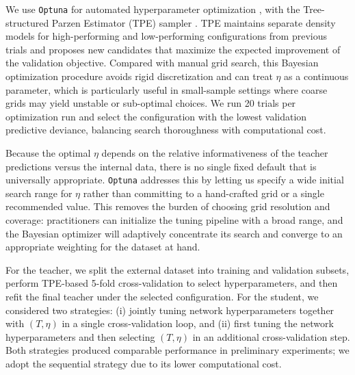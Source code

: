 \documentclass{article}
\theoremstyle{plain}
\theoremstyle{definition}
\theoremstyle{remark}
\begin{document}
We use \texttt{Optuna} for automated hyperparameter optimization \citep{optuna_2019}, with the Tree-structured Parzen Estimator (TPE) sampler \citep{bergstra2011algorithms, bergstra2013making, watanabe2023tree}.
TPE maintains separate density models for high-performing and low-performing configurations from previous trials and proposes new candidates that maximize the expected improvement of the validation objective.
Compared with manual grid search, this Bayesian optimization procedure avoids rigid discretization and can treat $\eta$ as a continuous parameter, which is particularly useful in small-sample settings where coarse grids may yield unstable or sub-optimal choices.
We run 20 trials per optimization run and select the configuration with the lowest validation predictive deviance, balancing search thoroughness with computational cost.


Because the optimal $\eta$ depends on the relative informativeness of the teacher predictions versus the internal data, there is no single fixed default that is universally appropriate.
\texttt{Optuna} addresses this by letting us specify a wide initial search range for $\eta$ rather than committing to a hand-crafted grid or a single recommended value.
This removes the burden of choosing grid resolution and coverage: practitioners can initialize the tuning pipeline with a broad range, and the Bayesian optimizer will adaptively concentrate its search and converge to an appropriate weighting for the dataset at hand.

For the teacher, we split the external dataset into training and validation subsets, perform TPE-based 5-fold cross-validation to select hyperparameters, and then refit the final teacher under the selected configuration.
For the student, we considered two strategies: (i) jointly tuning network hyperparameters together with $(T,\eta)$ in a single cross-validation loop, and (ii) first tuning the network hyperparameters and then selecting $(T,\eta)$ in an additional cross-validation step.
Both strategies produced comparable performance in preliminary experiments; we adopt the sequential strategy due to its lower computational cost.
\end{document}
